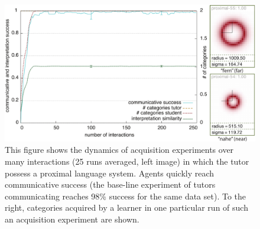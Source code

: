 \begin{figure} 
\begin{center}
\includegraphics[width=1.0\columnwidth]{figs/category-acquisition-proximal-results+categories}
\end{center}
\caption[Results acquisition of the proximal system]{This figure shows the dynamics of acquisition experiments over many interactions (25 runs averaged, 
left image) in which the tutor possess a proximal language system. 
Agents quickly reach communicative success (the base-line experiment of tutors communicating 
reaches 98\% success for the same data set). To the right, categories acquired by a learner in 
one particular run of such an acquisition experiment are shown.}
\label{f:category-acquisition-proximal-results}
\end{figure}

